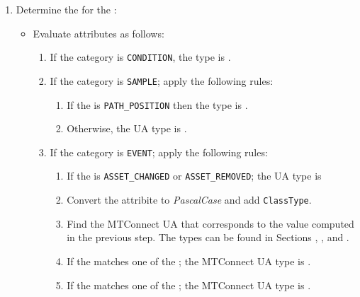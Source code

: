 \begin{enumerate}
\item Determine the   for the  :
    \begin{itemize}
    \item Evaluate  attributes as follows:
        \begin{enumerate}
        \setlength\itemsep{1em}
        \item If the category is \texttt{CONDITION}, the type is .
        
        \item If the category is \texttt{SAMPLE}; apply the following rules:
            \begin{enumerate}
            \item If the  is \texttt{PATH_POSITION} then the type is .
            \item Otherwise, the UA type is .
            \end{enumerate}
            
        \item If the category is \texttt{EVENT}; apply the following rules:
            \begin{enumerate}
            \setlength\itemsep{1em}
            \item If the  is \texttt{ASSET_CHANGED} or \texttt{ASSET_REMOVED}; the UA type is 
            
            \item Convert the  attribite to \textit{PascalCase} and add \texttt{ClassType}.
            
            \item Find the MTConnect UA  that corresponds to the value computed in the previous step.
            The types can be found in Sections , , and .
            
            \item If the  matches one of the ; the MTConnect UA type is .
            
            \item If the  matches one of the ; the MTConnect UA type is .
            

\end{enumerate}
\end{enumerate}
\end{itemize}
\end{enumerate}
